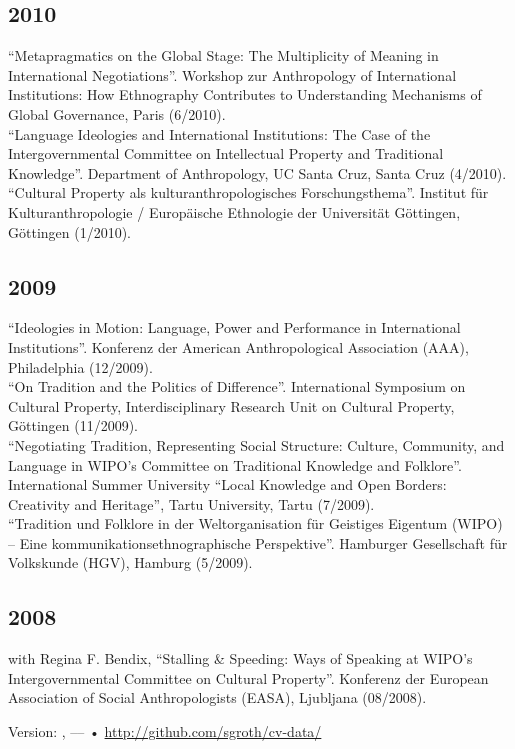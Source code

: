 \documentclass[11pt, a4paper]{article} %
\begin{document}
\subsection*{2010}
\enquote{Metapragmatics on the Global Stage: The Multiplicity of Meaning in International Negotiations}. Workshop zur Anthropology of International Institutions: How Ethnography Contributes to Understanding Mechanisms of Global Governance, Paris (6/2010).\\[.25cm]
\enquote{Language Ideologies and International Institutions: The Case of the Intergovernmental Committee on Intellectual Property and Traditional Knowledge}. Department of Anthropology, UC Santa Cruz, Santa Cruz (4/2010).\\[.25cm]
\enquote{Cultural Property als kulturanthropologisches Forschungsthema}. Institut für Kulturanthropologie / Europäische Ethnologie der Universität Göttingen, Göttingen (1/2010).
\subsection*{2009}
\enquote{Ideologies in Motion: Language, Power and Performance in International Institutions}. Konferenz der American Anthropological Association (AAA), Philadelphia (12/2009).\\[.25cm]
\enquote{On Tradition and the Politics of Difference}. International Symposium on Cultural Property, Interdisciplinary Research Unit on Cultural Property, Göttingen (11/2009).\\[.25cm]
\enquote{Negotiating Tradition, Representing Social Structure: Culture, Community, and Language in WIPO’s Committee on Traditional Knowledge and Folklore}. International Summer University “Local Knowledge and Open Borders: Creativity and Heritage”, Tartu University, Tartu (7/2009).\\[.25cm]
\enquote{Tradition und Folklore in der Weltorganisation für Geistiges Eigentum (WIPO) – Eine kommunikationsethnographische Perspektive}. Hamburger Gesellschaft für Volkskunde (HGV), Hamburg (5/2009).
\subsection*{2008}
with Regina F. Bendix, \enquote{Stalling \& Speeding: Ways of Speaking at WIPO’s Intergovernmental Committee on Cultural Property}. Konferenz der European Association of Social Anthropologists (EASA), Ljubljana (08/2008).
\vfill{} %
\begin{center}
{\scriptsize Version: \href{https://github.com/sgroth/cv-data}{\gfiGetCommitAbr}, \gfiGetYear--\gfiGetMonth--\gfiGetDay\- •\- \href{http://github.com/sgroth/cv-data/}{http://github.com/sgroth/cv-data/}} 
\end{center}
\end{document}
